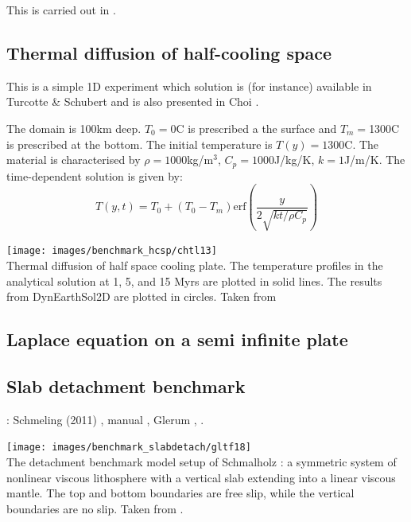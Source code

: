 This is carried out in .

\subsection{Thermal diffusion of half-cooling space} \label{sec:hcsp}

This is a simple 1D experiment which solution is (for instance) available 
in Turcotte \& Schubert \cite{tusc} and is also presented in Choi \etal \cite{chtl13}.

The domain is 100km deep. $T_0=$0\degree C is prescribed a the surface and 
$T_m=$1300\degree C is prescribed at the bottom. The initial temperature is $T(y)=1300$\degree C.
The material is characterised by $\rho=1000$kg/m$^3$, $C_p=1000$J/kg/K, 
$k=1$J/m/K. The time-dependent solution is given by:
\begin{equation}
T(y,t)=T_0 + (T_0-T_m) \text{erf} \left( \frac{y}{2\sqrt{k t /\rho C_p}}  \right)
\end{equation}

\begin{center}
\texttt{[image: images/benchmark\_hcsp/chtl13]}\\
{\captionfont Thermal diffusion of half space cooling plate.
The temperature profiles in the analytical solution at 1, 5,
and 15 Myrs are plotted in solid lines. The results from
DynEarthSol2D are plotted in circles. Taken from \cite{chtl13}}
\end{center}


\subsection{Laplace equation on a semi infinite plate} \label{sec:lapplate}


\subsection{Slab detachment benchmark} \label{sec:slabdetach}

\Literature: Schmeling (2011) \cite{schm11}, \aspect manual \cite{aspectmanual}, Glerum \etal \cite{gltf18}, 
.

\begin{center}
\texttt{[image: images/benchmark\_slabdetach/gltf18]}\\
{\captionfont The detachment benchmark model setup of Schmalholz \cite{schm11}: 
a symmetric system of nonlinear viscous lithosphere with a vertical slab extending into a linear 
viscous mantle. The top and bottom boundaries are free slip, while the vertical boundaries are no slip.
Taken from \cite{gltf18}.}
\end{center}

